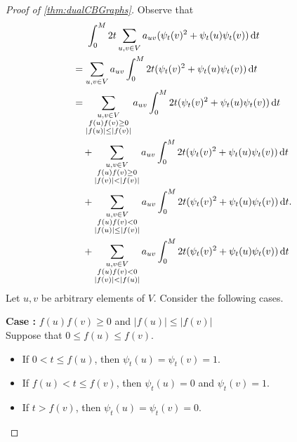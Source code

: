 \documentclass[12pt,a4paper,bold]{thesis}
\theoremstyle{definition}
\newcommand*{\abs}[1]{\left\vert #1 \right\vert}
\newcounter{casenum}
\newenvironment{caseof}{\setcounter{casenum}{1}}{\vskip0\baselineskip}
\newcommand{\case}[2]{\vskip0\baselineskip\par\noindent 
{\bfseries Case \arabic{casenum}:} #1\\#2\addtocounter{casenum}{1}}
\begin{document}
\begin{proof}[Proof of \cref{thm:dualCBGraphs}]
    Observe that
    \begin{align*}
        & \hspace{0.49cm} 
        \int_{0}^{M} 2t \sum_{u,v \in V} a_{uv} (\psi_t(v)^2 + \psi_t(u)\psi_t(v))\, \mathrm{d}t 
        \\
        & = 
        \sum_{u,v \in V} a_{uv} \int_{0}^{M} 2t (\psi_t(v)^2 + \psi_t(u)\psi_t(v))\, \mathrm{d}t 
        \\
        & = 
        \sum_{\substack{u,v \in V \\ f(u)f(v) \geq 0 \\ \abs{f(u)} \leq \abs{f(v)}}} 
        a_{uv} \int_{0}^{M} 2t (\psi_t(v)^2 + \psi_t(u)\psi_t(v))\, \mathrm{d}t
        \\
        & \quad + 
        \sum_{\substack{u,v \in V \\ f(u)f(v) \geq 0 \\ \abs{f(v)} < \abs{f(v)}}} 
        a_{uv} \int_{0}^{M} 2t (\psi_t(v)^2 + \psi_t(u)\psi_t(v))\, \mathrm{d}t
        \\
        & \quad + 
        \sum_{\substack{u,v \in V \\ f(u)f(v) < 0 \\ \abs{f(u)} \leq \abs{f(v)}}} 
        a_{uv} \int_{0}^{M} 2t (\psi_t(v)^2 + \psi_t(u)\psi_t(v))\, \mathrm{d}t.
        \\
        & \quad + 
        \sum_{\substack{u,v \in V \\ f(u)f(v) < 0 \\ \abs{f(v)} < \abs{f(u)}}} 
        a_{uv} \int_{0}^{M} 2t (\psi_t(v)^2 + \psi_t(u)\psi_t(v))\, \mathrm{d}t
    \end{align*} 
    Let $u, v$ be arbitrary elements of $V$. Consider the following cases.
    \begin{caseof}
        \case{$f(u)f(v) \geq 0$ and $\abs{f(u)} \leq \abs{f(v)}$}
        {Suppose that $0 \leq f(u) \leq f(v)$. 
        \vspace{-0.4\baselineskip} 
        \begin{itemize}[leftmargin=*,noitemsep]
            \item If $0 < t \leq f(u)$, then $\psi_t(u) = \psi_t(v) = 1$.
            \item If $f(u) < t \leq f(v)$, then $\psi_t(u) = 0$ and $\psi_t(v) = 1$.
            \item If $t > f(v)$, then $\psi_t(u) = \psi_t(v) = 0$.
        \end{itemize}
        \vspace{-0.4\baselineskip}
}
\end{caseof}
\end{proof}
\end{document}
